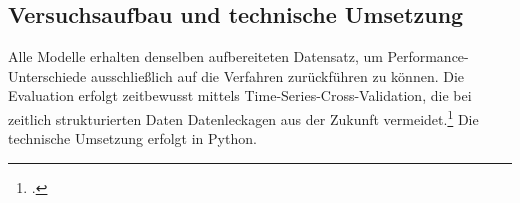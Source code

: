 \documentclass[12pt,a4paper]{article}
\begin{document}
\subsection{Versuchsaufbau und technische Umsetzung}



Alle Modelle erhalten denselben aufbereiteten Datensatz, um Performance-Unterschiede ausschließlich
auf die Verfahren zurückführen zu können. Die Evaluation erfolgt zeitbewusst mittels
Time-Series-Cross-Validation, die bei zeitlich strukturierten Daten Datenleckagen aus der Zukunft
vermeidet.\footcite[192-193]{Bergmeir2012} Die technische Umsetzung erfolgt in Python.

\end{document}
